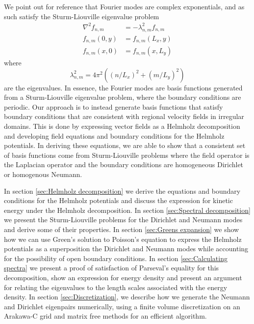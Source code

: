 \documentclass[draft]{agujournal2019}
\begin{document}
We point out for reference that Fourier modes are complex exponentials, and as such satisfy the Sturm-Liouville eigenvalue problem
\begin{subequations}
    \begin{align}
        \nabla^2 f_{n,m} &= -\lambda_{n,m}^2 f_{n,m} \\
        f_{n,m}(0,y) &= f_{n,m}(L_x,y) \\
        f_{n,m}(x,0) &= f_{n,m}(x,L_y)
    \end{align} \label{eq:fourier basis problem}
\end{subequations}
where
\begin{equation}
    \lambda_{n,m}^2 = 4\pi^2((n/L_x)^2 + (m/L_y)^2) \label{eq:fourier eigenvalues}
\end{equation}
are the eigenvalues. In essence, the Fourier modes are basis functions generated from a Sturm-Liouville eigenvalue problem, where the boundary conditions are periodic. Our approach is to instead generate basis functions that satisfy boundary conditions that are consistent with regional velocity fields in irregular domains. This is done by expressing vector fields as a Helmholz decomposition and developing field equations and boundary conditions for the Helmholz potentials. In deriving these equations, we are able to show that a consistent set of basis functions come from Sturm-Liouville problems where the field operator is the Laplacian operator and the boundary conditions are homogeneous Dirichlet or homogenous Neumann. 

In section \ref{sec:Helmholz decomposition} we derive the equations and boundary conditions for the Helmholz potentials and discuss the expression for kinetic energy under the Helmholz decomposition. In section \ref{sec:Spectral decomposition} we present the Sturm-Liouville problems for the Dirichlet and Neumann modes and derive some of their properties. In section \ref{sec:Greens expansion} we show how we can use Green's solution to Poisson's equation to express the Helmholz potentials as a superposition the Dirichlet and Neumann modes while accounting for the possibility of open boundary conditions. In section \ref{sec:Calculating spectra} we present a proof of satisfaction of Parseval's equality for this decomposition, show an expression for energy density and present an argument for relating the eigenvalues to the length scales associated with the energy density. In section \ref{sec:Discretization}, we describe how we generate the Neumann and Dirichlet eigenpairs numerically, using a finite volume discretization on an Arakawa-C grid and matrix free methods for an efficient algorithm.
\end{document}
